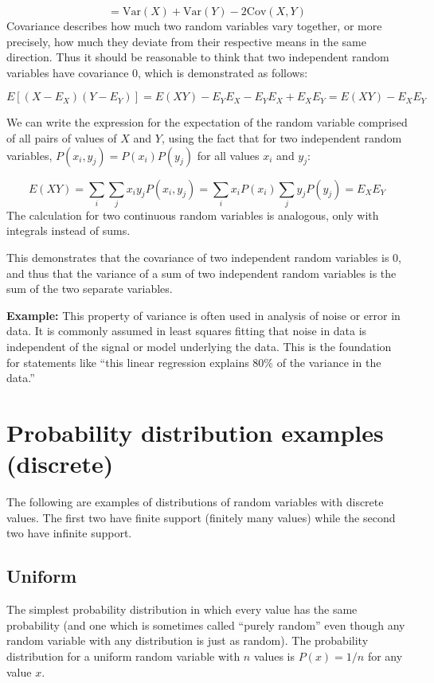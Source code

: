 \documentclass[
  letterpaper,
  DIV=11,
  numbers=noendperiod]{scrreprt}
\begin{document}
\[= \text{Var}(X) + \text{Var}(Y) - 2 \text{Cov}(X,Y) \] Covariance
describes how much two random variables vary together, or more
precisely, how much they deviate from their respective means in the same
direction. Thus it should be reasonable to think that two independent
random variables have covariance 0, which is demonstrated as follows:

\[E[(X-E_X)(Y-E_Y)] = E(XY) - E_Y E_X - E_YE_X + E_XE_Y = E(XY) - E_X E_Y  \]

We can write the expression for the expectation of the random variable
comprised of all pairs of values of \(X\) and \(Y\), using the fact that
for two independent random variables, \(P(x_i,y_j) = P(x_i)P(y_j)\) for
all values \(x_i\) and \(y_j\):

\[E(XY) = \sum_i \sum_j x_iy_j P(x_i,y_j) = \sum_i x_i P(x_i) \sum_j y_j P(y_j) = E_X E_Y\]
The calculation for two continuous random variables is analogous, only
with integrals instead of sums.

This demonstrates that the covariance of two independent random
variables is 0, and thus that the variance of a sum of two independent
random variables is the sum of the two separate variables.

\textbf{Example:} This property of variance is often used in analysis of
noise or error in data. It is commonly assumed in least squares fitting
that noise in data is independent of the signal or model underlying the
data. This is the foundation for statements like ``this linear
regression explains 80\% of the variance in the data.''

\section{Probability distribution examples
(discrete)}\label{probability-distribution-examples-discrete}

The following are examples of distributions of random variables with
discrete values. The first two have finite support (finitely many
values) while the second two have infinite support.

\subsection{Uniform}\label{uniform}

The simplest probability distribution in which every value has the same
probability (and one which is sometimes called ``purely random'' even
though any random variable with any distribution is just as random). The
probability distribution for a uniform random variable with \(n\) values
is \(P(x) = 1/n\) for any value \(x\).
\end{document}
